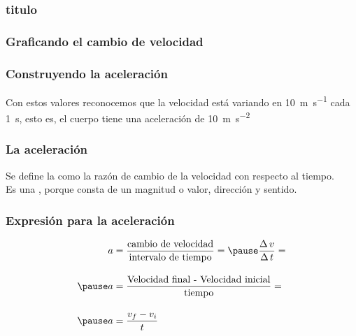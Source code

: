 \documentclass[14pt]{beamer}
\begin{document}
\begin{frame}
\frametitle{titulo}
\frametitle{Graficando el cambio de velocidad}
\vspace{-1cm}
\begin{figure}
    \centering
\end{figure}
\end{frame}
\begin{frame}
\frametitle{Construyendo la aceleración}
Con estos valores reconocemos que la velocidad está variando en \SI{10}{\meter\per\second} cada \SI{1}{\second}, \pause esto es, el cuerpo tiene una aceleración de \SI{10}{\meter\per\square\second}
\end{frame}
\begin{frame}
\frametitle{La aceleración}
Se define la  \pause como la razón de cambio de la velocidad con respecto al tiempo.
\\
\bigskip
\pause
Es una , porque consta de un magnitud o valor, dirección y sentido.
\end{frame}
\begin{frame}
\frametitle{Expresión para la aceleración}
\begin{eqnarray*}
\begin{aligned}
a &= \dfrac{\text{cambio de velocidad}}{\text{intervalo de tiempo}} = \pause \dfrac{\Delta \, v}{\Delta \, t} = \\[1em] \pause
a &= \dfrac{\text{Velocidad final - Velocidad inicial}}{\text{tiempo}} = \\[1em] \pause
a &= \dfrac{v_{f} - v_{i}}{t}
\end{aligned}
\end{eqnarray*}
\end{frame}
\end{document}
